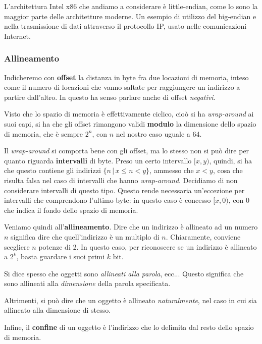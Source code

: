 \documentclass[a4paper,11pt]{article}
\begin{document}
L'architettura Intel x86 che andiamo a considerare è little-endian, come lo sono la maggior parte delle architetture moderne.
Un esempio di utilizzo del big-endian e nella trasmissione di dati attraverso il protocollo IP, usato nelle comunicazioni Internet.

\subsubsection{Allineamento}
Indicheremo con \textbf{offset} la distanza in byte fra due locazioni di memoria, inteso come il numero di locazioni che vanno saltate per raggiungere un indirizzo a partire dall'altro.
In questo ha senso parlare anche di offset \textit{negativi}.

Visto che lo spazio di memoria è effettivamente ciclico, cioò si ha \textit{wrap-around} ai suoi capi, si ha che gli offset rimangono validi \textbf{modulo} la dimensione dello spazio di memoria, che è sempre $2^n$, con $n$ nel nostro caso uguale a 64.

Il \textit{wrap-around} si comporta bene con gli offset, ma lo stesso non si può dire per quanto riguarda \textbf{intervalli} di byte.
Preso un certo intervallo $[x, y)$, quindi, si ha che questo contiene gli indirizzi $\{n \, | \, x \leq n < y\}$, ammesso che $x < y$, cosa che risulta falsa nel caso di intervalli che hanno \textit{wrap-around}. 
Decidiamo di non considerare intervalli di questo tipo.
Questo rende necessaria un'eccezione per intervalli che comprendono l'ultimo byte: in questo caso è concesso $[x, 0)$, con 0 che indica il fondo dello spazio di memoria.

Veniamo quindi all'\textbf{allineamento}.
Dire che un indirizzo è allineato ad un numero $n$ significa dire che quell'indirizzo è un multiplo di $n$.
Chiaramente, conviene scegliere $n$ potenze di 2.
In questo caso, per riconoscere se un indirizzo è allineato a $2^k$, basta guardare i suoi primi $k$ bit.

Si dice spesso che oggetti sono \textit{allineati alla parola}, ecc...
Questo significa che sono allineati alla \textit{dimensione} della parola specificata.

Altrimenti, si può dire che un oggetto è allineato \textit{naturalmente}, nel caso in cui sia allineato alla dimensione di stesso.

Infine, il \textbf{confine} di un oggetto è l'indirizzo che lo delimita dal resto dello spazio di memoria.
\end{document}
